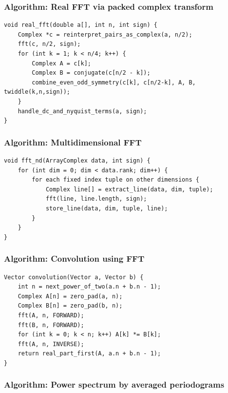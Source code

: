 \documentclass[11pt]{article}
\begin{document}
\subsubsection{Algorithm: Real FFT via packed complex transform}\label{algorithm-real-fft-via-packed-complex-transform}

\begin{verbatim}
void real_fft(double a[], int n, int sign) {
    Complex *c = reinterpret_pairs_as_complex(a, n/2);
    fft(c, n/2, sign);
    for (int k = 1; k < n/4; k++) {
        Complex A = c[k];
        Complex B = conjugate(c[n/2 - k]);
        combine_even_odd_symmetry(c[k], c[n/2-k], A, B, twiddle(k,n,sign));
    }
    handle_dc_and_nyquist_terms(a, sign);
}
\end{verbatim}

\subsubsection{Algorithm: Multidimensional FFT}\label{algorithm-multidimensional-fft}

\begin{verbatim}
void fft_nd(ArrayComplex data, int sign) {
    for (int dim = 0; dim < data.rank; dim++) {
        for each fixed index tuple on other dimensions {
            Complex line[] = extract_line(data, dim, tuple);
            fft(line, line.length, sign);
            store_line(data, dim, tuple, line);
        }
    }
}
\end{verbatim}

\subsubsection{Algorithm: Convolution using FFT}\label{algorithm-convolution-using-fft}

\begin{verbatim}
Vector convolution(Vector a, Vector b) {
    int n = next_power_of_two(a.n + b.n - 1);
    Complex A[n] = zero_pad(a, n);
    Complex B[n] = zero_pad(b, n);
    fft(A, n, FORWARD);
    fft(B, n, FORWARD);
    for (int k = 0; k < n; k++) A[k] *= B[k];
    fft(A, n, INVERSE);
    return real_part_first(A, a.n + b.n - 1);
}
\end{verbatim}

\subsubsection{Algorithm: Power spectrum by averaged periodograms}\label{algorithm-power-spectrum-by-averaged-periodograms}
\end{document}
